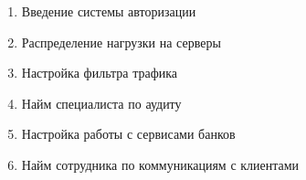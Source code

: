 \begin{enumerate}
\item Введение системы авторизации
\item Распределение нагрузки на серверы
\item Настройка фильтра трафика
\item Найм специалиста по аудиту
\item Настройка работы с сервисами банков
\item Найм сотрудника по коммуникациям с клиентами
\end{enumerate}
